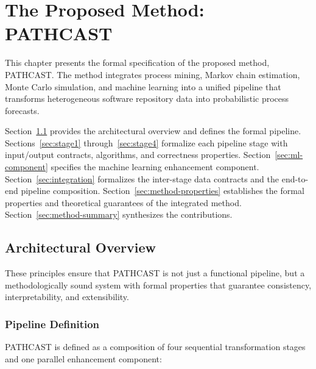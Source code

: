 
\chapter{The Proposed Method: PATHCAST}
\label{ch:method}

This chapter presents the formal specification of the proposed method, 
PATHCAST. The method integrates process mining, 
Markov chain estimation, Monte Carlo simulation, and machine learning into a 
unified pipeline that transforms heterogeneous software repository data into 
probabilistic process forecasts.

Section~\ref{sec:method-overview} provides the architectural overview and 
defines the formal pipeline. Sections~\ref{sec:stage1} 
through~\ref{sec:stage4} formalize each pipeline stage with input/output 
contracts, algorithms, and correctness properties. 
Section~\ref{sec:ml-component} specifies the machine learning enhancement 
component. Section~\ref{sec:integration} formalizes the inter-stage data 
contracts and the end-to-end pipeline composition. 
Section~\ref{sec:method-properties} establishes the formal properties and 
theoretical guarantees of the integrated method. 
Section~\ref{sec:method-summary} synthesizes the contributions.


\section{Architectural Overview}
\label{sec:method-overview}
These principles ensure that PATHCAST is not just a functional pipeline, but a methodologically sound system with formal properties that guarantee consistency, interpretability, and extensibility.

\subsection{Pipeline Definition}
\label{sec:pipeline-def}

PATHCAST is defined as a composition of four sequential transformation 
stages and one parallel enhancement component:

